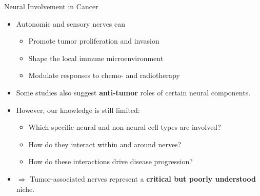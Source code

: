 \documentclass[10pt]{beamer}
\theoremstyle{plain}
\begin{document}
\begin{frame}{Neural Involvement in Cancer}
  \begin{itemize}
    \item Autonomic and sensory nerves can
      \begin{itemize}
        \item Promote tumor proliferation and invasion
        \item Shape the local immune microenvironment
        \item Modulate responses to chemo- and radiotherapy
      \end{itemize}
    \item Some studies also suggest \textbf{anti-tumor} roles of certain neural components.
    \item However, our knowledge is still limited:
      \begin{itemize}
        \item Which specific neural and non-neural cell types are involved?
        \item How do they interact within and around nerves?
        \item How do these interactions drive disease progression?
      \end{itemize}
    \item \(\Rightarrow\) Tumor-associated nerves represent a \textbf{critical but poorly understood} niche.
  \end{itemize}
\end{frame}
\end{document}
